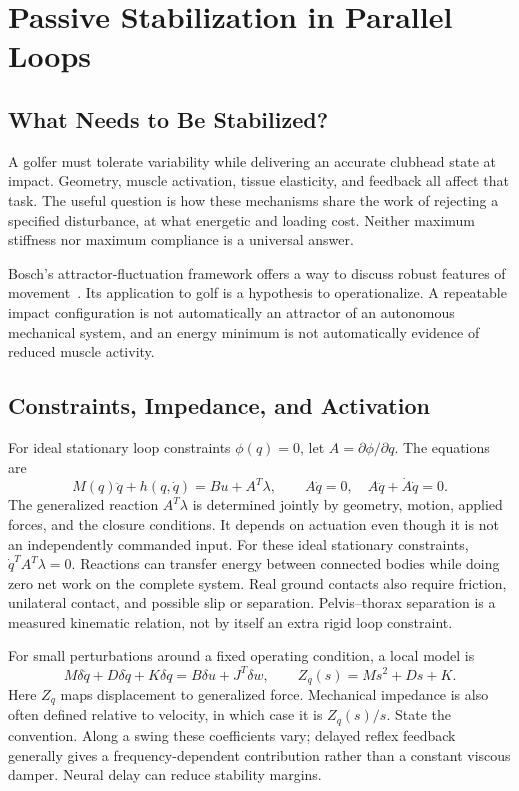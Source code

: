 \chapter{Passive Stabilization in Parallel Loops}
\label{ch:passive_stabilization}

\section{What Needs to Be Stabilized?}

A golfer must tolerate variability while delivering an accurate clubhead state
at impact. Geometry, muscle activation, tissue elasticity, and feedback all
affect that task. The useful question is how these mechanisms share the work
of rejecting a specified disturbance, at what energetic and loading cost.
Neither maximum stiffness nor maximum compliance is a universal answer.

Bosch's attractor-fluctuation framework offers a way to discuss robust features
of movement~\cite{bosch2020agility}. Its application to golf is a hypothesis
to operationalize. A repeatable impact configuration is not automatically an
attractor of an autonomous mechanical system, and an energy minimum is not
automatically evidence of reduced muscle activity.

\section{Constraints, Impedance, and Activation}
\label{sec:stabilization_problem}

For ideal stationary loop constraints $\phi(q)=0$, let $A=\partial\phi/\partial q$.
The equations are
\begin{equation}
M(q)\ddot q+h(q,\dot q)=Bu+A^T\lambda,\qquad
A\dot q=0,\quad A\ddot q+\dot A\dot q=0.
\label{eq:constrained_eom}
\end{equation}
The generalized reaction $A^T\lambda$ is determined jointly by geometry,
motion, applied forces, and the closure conditions. It depends on actuation
even though it is not an independently commanded input. For these ideal
stationary constraints, $\dot q^TA^T\lambda=0$. Reactions can transfer energy
between connected bodies while doing zero net work on the complete system.
Real ground contacts also require friction, unilateral contact, and possible
slip or separation. Pelvis--thorax separation is a measured kinematic relation,
not by itself an extra rigid loop constraint.

For small perturbations around a fixed operating condition, a local model is
\begin{equation}
M\delta\ddot q+D\delta\dot q+K\delta q=B\delta u+J^T\delta w,
\qquad Z_q(s)=Ms^2+Ds+K.
\label{eq:impedance_control}
\end{equation}
Here $Z_q$ maps displacement to generalized force. Mechanical impedance is
also often defined relative to velocity, in which case it is $Z_q(s)/s$.
State the convention. Along a swing these coefficients vary; delayed reflex
feedback generally gives a frequency-dependent contribution rather than a
constant viscous damper. Neural delay can reduce stability margins.

